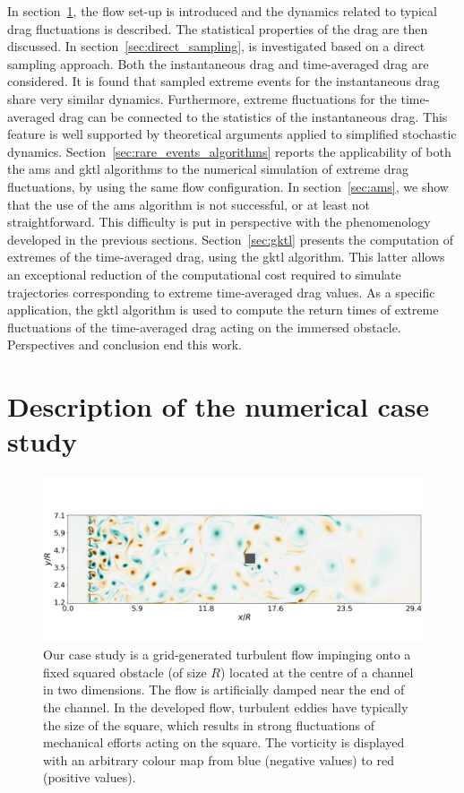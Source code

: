 \documentclass{jfm}
\newcommand{\EL}[1]{{\color{myred}{#1}}}
\begin{document}
In section~\ref{sec:test_flow}, the flow set-up is introduced and the dynamics related to typical
drag fluctuations is described.
The statistical properties of the drag are then discussed.
In section~\ref{sec:direct_sampling}, \EL{the phenomenology of  extreme
  drag fluctuations} is investigated based on a direct sampling approach.
Both the instantaneous drag and time-averaged drag are considered.
It is found that sampled extreme events for the instantaneous drag share very similar dynamics. Furthermore, extreme fluctuations for the time-averaged drag can be connected to the statistics of the instantaneous drag.
This feature is well supported by theoretical arguments applied to simplified stochastic dynamics.
Section~\ref{sec:rare_events_algorithms} reports the applicability of both the \ac{ams} and \ac{gktl} algorithms to the numerical simulation of extreme drag fluctuations, by using the same flow configuration.
In section~\ref{sec:ams}, we show that the use of the \ac{ams} algorithm is not successful, or at least not straightforward. This difficulty is put in perspective with the phenomenology developed in the previous sections.
Section~\ref{sec:gktl} presents the computation of extremes of the time-averaged drag, using the \ac{gktl} algorithm.
This latter allows an exceptional reduction of the computational cost required to simulate trajectories corresponding to extreme time-averaged drag values.
As a specific application, the \ac{gktl} algorithm is used to compute the return times of extreme fluctuations of the time-averaged drag acting on the immersed obstacle.
Perspectives and conclusion end this work.

\section{Description of the numerical case study}
\label{sec:test_flow}

\begin{figure}
  \centering
  \includegraphics[width=\linewidth]{illustr_ecoulement/illustr_ecoulement}
  \caption{Our case study is a grid-generated turbulent flow impinging onto a fixed squared obstacle (of size $R$) located at the centre of a channel in two dimensions. The flow is artificially damped near the end of the channel. In the developed flow, turbulent eddies have typically the size of the square, which results in strong fluctuations of mechanical efforts acting on the square. The vorticity is displayed with an arbitrary colour map from blue (negative values) to red (positive values).}
  \label{fig:illustr_ecoulement}
\end{figure}
\end{document}

